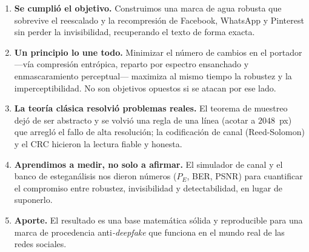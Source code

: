 \documentclass[12pt,a4paper]{article}
\renewcommand{\nobreakdash}{}
\begin{document}
\begin{enumerate}[label=\textbf{\arabic*.}, leftmargin=2.2em]
\item \textbf{Se cumplió el objetivo.} Construimos una marca de agua robusta que sobrevive el
reescalado y la recompresión de Facebook, WhatsApp y Pinterest sin perder la invisibilidad,
recuperando el texto de forma exacta.
\item \textbf{Un principio lo une todo.} Minimizar el número de cambios en el portador ---vía
compresión entrópica, reparto por espectro ensanchado y enmascaramiento perceptual--- maximiza
al mismo tiempo la robustez y la imperceptibilidad. No son objetivos opuestos si se atacan por
ese lado.
\item \textbf{La teoría clásica resolvió problemas reales.} El teorema de muestreo dejó de ser
abstracto y se volvió una regla de una línea (acotar a $2048$~px) que arregló el fallo de alta
resolución; la codificación de canal (Reed\nobreakdash-Solomon) y el CRC hicieron la lectura
fiable y honesta.
\item \textbf{Aprendimos a medir, no solo a afirmar.} El simulador de canal y el banco de
esteganálisis nos dieron números ($P_E$, BER, PSNR) para cuantificar el compromiso entre
robustez, invisibilidad y detectabilidad, en lugar de suponerlo.
\item \textbf{Aporte.} El resultado es una base matemática sólida y reproducible para una
marca de procedencia anti\emph{-deepfake} que funciona en el mundo real de las redes sociales.
\end{enumerate}
\end{document}
